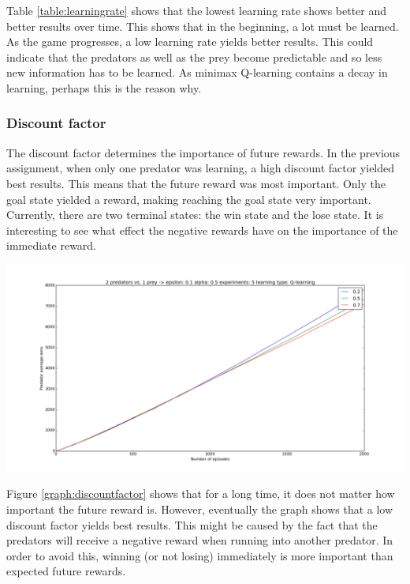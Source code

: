Table \ref{table:learningrate} shows that the lowest learning rate shows better and better results over time. This shows that in the beginning, a lot must be learned. As the game progresses, a low learning rate yields better results. This could indicate that the predators as well as the prey become predictable and so less new information has to be learned. As minimax Q-learning contains a decay in learning, perhaps this is the reason why.  %


\subsubsection{Discount factor}
The discount factor determines the importance of future rewards. In the previous assignment, when only one predator was learning, a high discount factor yielded best results. This means that the future reward was most important. Only the goal state yielded a reward, making reaching the goal state very important. Currently, there are two terminal states: the win state and the lose state. It is interesting to see what effect the negative rewards have on the importance of the immediate reward.

\begin{center}
	\includegraphics[scale=0.3]{2_predators_discount_factor_q_learning}
	\label{graph:discountfactor}
\end{center}

Figure \ref{graph:discountfactor} shows that for a long time, it does not matter how important the future reward is. However, eventually the graph shows that a low discount factor yields best results. This might be caused by the fact that the predators will receive a negative reward when running into another predator. In order to avoid this, winning (or not losing) immediately is more important than expected future rewards.

